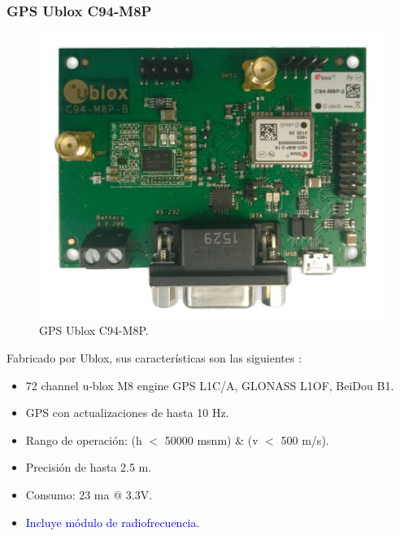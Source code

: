 \subsubsection{GPS Ublox C94-M8P}

\begin{figure}[H]
\centering
\includegraphics[scale=0.50]{Figures/ublox}
\caption[GPS Ublox C94-M8P.]{GPS Ublox C94-M8P.}
\label{fig:ubx}
\end{figure}

Fabricado por Ublox, sus características son las siguientes \citep{ubloxc94}:

\begin{itemize}
\item 72 channel u-blox M8 engine GPS L1C/A, GLONASS L1OF, BeiDou B1.\\
\item GPS con actualizaciones de hasta 10 Hz.\\
\item Rango de operación: (h $<$ 50000 msnm) \& (v $<$ 500 m/s).\\
\item Precisión de hasta 2.5 m.\\
\item Consumo: 23 ma @ 3.3V.\\
\item \textcolor{blue}{Incluye módulo de radiofrecuencia.}\\
\end{itemize}

